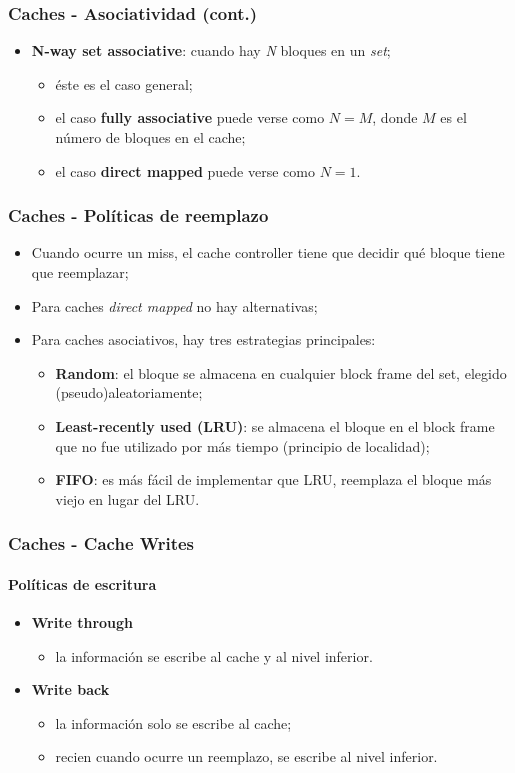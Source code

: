 \documentclass{beamer}
\begin{document}
\begin{frame}
\frametitle{Caches - Asociatividad (cont.)}
    \begin{itemize}
        \item \textbf{N-way set associative}: cuando hay \emph{N} bloques en un
      \emph{set};
      \begin{itemize}
      \item éste es el caso general;
      \item el caso \textbf{fully associative} puede verse como $N=M$, donde $M$
      es el número de bloques en el cache;
      \item el caso \textbf{direct mapped} puede verse como $N=1$.
      \end{itemize}
      \end{itemize}
  \end{frame}
  
  \begin{frame}
  \frametitle{Caches - Políticas de reemplazo}
    \begin{itemize}
      \item Cuando ocurre un miss, el cache controller tiene que decidir qué
      bloque tiene que reemplazar;
      \item Para caches \emph{direct mapped} no hay alternativas;
      \item Para caches asociativos, hay tres estrategias principales:
      \begin{itemize}
        \item \textbf{Random}: el bloque se almacena en cualquier block frame
	del set, elegido (pseudo)aleatoriamente;
	\item \textbf{Least-recently used (LRU)}: se almacena el bloque en el
	block frame que no fue utilizado por más tiempo (principio de localidad);
	\item \textbf{FIFO}: es más fácil de implementar que LRU, reemplaza el
	bloque más viejo en lugar del LRU.
      \end{itemize}
    \end{itemize}
  \end{frame}

  

\begin{frame}
\frametitle{Caches - Cache Writes}
\framesubtitle{Políticas de escritura}
\begin{itemize}
        \item \textbf{Write through}
	\begin{itemize}
	  \item la información se escribe al cache y al nivel inferior.
	\end{itemize}
\bigskip
	\item \textbf{Write back}
	\begin{itemize}
	  \item la información solo se escribe al cache;
	  \item recien cuando ocurre un reemplazo, se escribe al nivel inferior.
	\end{itemize}

    \end{itemize}
  \end{frame}
\end{document}
